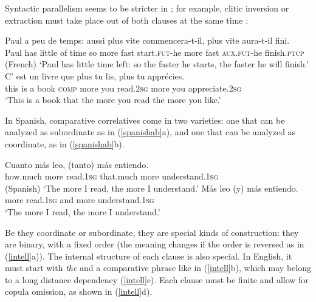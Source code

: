 {Syntactic parallelism seems to be stricter in ; for example, clitic inversion or extraction
must take place out of both clauses at the same time \citep[]{Abeille:Borsley:08}:

\begin{exe}
 \ex
\begin{xlista}
\ex 
\gll Paul a     peu  de temps: aussi plus  vite commencera-t-il,  plus   vite  aura-t-il  fini.\\
     Paul has little of time so more fast start.\textsc{fut}-he more fast  \textsc{aux}.\textsc{fut}-he finish.\textsc{ptcp} \\\hfill{(French)}
\glt `Paul has little time left: so the faster he starts, the faster he will finish.'
\ex \gll C'   est un livre  que      plus   tu    lis, plus  tu    appr\'{e}cies. \\
this is    a  book \textsc{comp} more you read.2\textsc{sg}  more you appreciate.2\textsc{sg} \\
\glt `This is a book that the more you read the more you like.'
\end{xlista}
\end{exe}

In Spanish, comparative correlatives come in two varieties: one that can be analyzed as subordinate
as in (\ref{spanishab}a), 
 and one that can be analyzed as coordinate, as in (\ref{spanishab}b).

\begin{exe}
 \ex
\begin{xlista}
\ex 
\gll Cuanto   m\'{a}s leo,     (tanto)        m\'{a}s entiendo. \\
     how.much more    read.1\textsc{sg} that.much more understand.1\textsc{sg} \\\hfill{(Spanish)}
\glt `The more I read, the more I understand.'
\ex 
\gll	M\'{a}s leo        (y) m\'{a}s entiendo. \\
	more read.1\textsc{sg} and more understand.1\textsc{sg} \\
\glt `The more I read, the more I understand.'\\ 
 \citep[]{Abeille:Borsley:Espinal:06}
\end{xlista}\label{spanishab}
\end{exe}

Be they coordinate or subordinate, they are special kinds of construction: they are binary, with a fixed order (the meaning changes if the order is reversed
as in (\ref{intell}a)).
The internal structure of each clause is also special. In English, it must start with \emph{the} and a comparative phrase like in (\ref{intell}b), which may belong to a long distance dependency 
(\ref{intell}c). Each clause must be finite and allow for copula omission, as shown in (\ref{intell}d).

}
